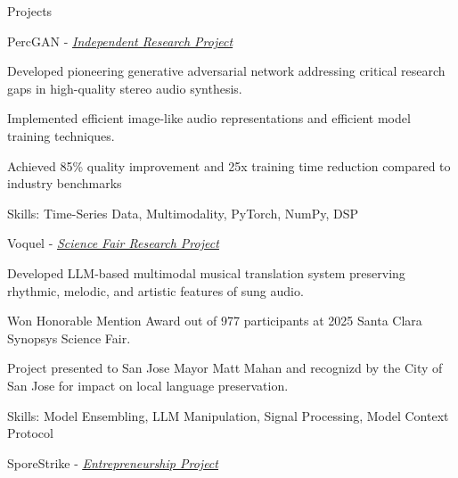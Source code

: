 \documentclass[
  10pt, %
]{resume}
\begin{document}
\begin{rSection}{Projects}

  
    \begin{rSubsection}{PercGAN - \textit{\underline{\href{https://github.com/shuklabhay/stereo-sample-gan}{Independent Research Project}}}}{}{}{}
        
      \item Developed pioneering generative adversarial network addressing critical research gaps in high-quality stereo audio synthesis.
          
      \item Implemented efficient image-like audio representations and efficient model training techniques.
          
      \item Achieved 85\% quality improvement and 25x training time reduction compared to industry benchmarks
          
      \item Skills: Time-Series Data, Multimodality, PyTorch, NumPy, DSP
          
    \end{rSubsection}
        
    \begin{rSubsection}{Voquel - \textit{\underline{\href{https://shuklabhay.github.io/static/projects/vox-transformis/vt_poster.png}{Science Fair Research Project}}}}{}{}{}
        
      \item Developed LLM-based multimodal musical translation system preserving rhythmic, melodic, and artistic features of sung audio.
          
      \item Won Honorable Mention Award out of 977 participants at 2025 Santa Clara Synopsys Science Fair.
          
      \item Project presented to San Jose Mayor Matt Mahan and recognizd by the City of San Jose for impact on local language preservation.
          
      \item Skills: Model Ensembling, LLM Manipulation, Signal Processing, Model Context Protocol
          
    \end{rSubsection}
        
    \begin{rSubsection}{SporeStrike - \textit{\underline{\href{https://shuklabhay.github.io/static/projects/sporestrike/FlexFactor_SporeStrike_pitch.pdf}{Entrepreneurship Project}}}}{}{}{}
        

\end{rSubsection}
\end{rSection}
\end{document}
